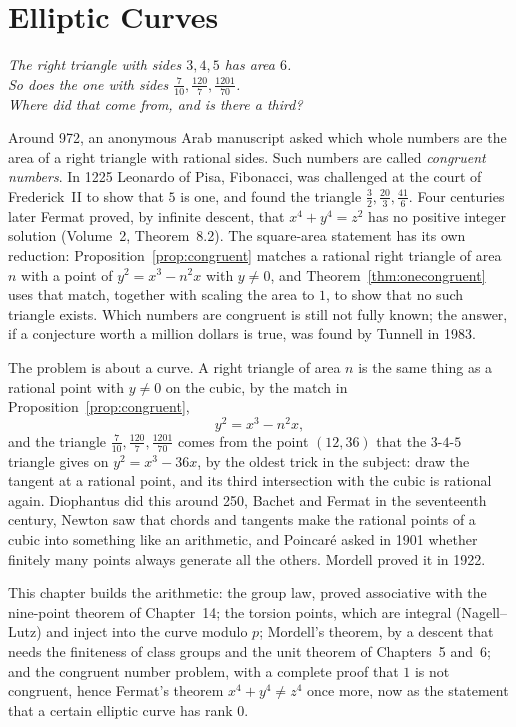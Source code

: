 \chapter{Elliptic Curves}
\begin{center}\itshape
The right triangle with sides $3,4,5$ has area $6$.\\
So does the one with sides $\frac7{10},\frac{120}7,\frac{1201}{70}$.\\
Where did that come from, and is there a third?
\end{center}

Around 972, an anonymous Arab manuscript asked which whole numbers are the area of a right triangle with rational sides. Such numbers
are called \emph{congruent numbers}. In 1225 Leonardo of Pisa, Fibonacci, was challenged at the court of Frederick~II to show that $5$ is
one, and found the triangle $\frac32,\frac{20}3,\frac{41}6$. Four centuries later Fermat proved, by infinite descent, that $x^4+y^4=z^2$ has no positive integer solution (Volume~2, Theorem~8.2). The square-area statement has its own reduction: Proposition~\ref{prop:congruent} matches a rational right triangle of area $n$ with a point of $y^2=x^3-n^2x$ with $y\ne0$, and Theorem~\ref{thm:onecongruent} uses that match, together with scaling the area to $1$, to show that no such triangle exists. Which numbers are congruent is still not fully
known; the answer, if a conjecture worth a million dollars is true, was found by Tunnell in 1983.

The problem is about a curve. A right triangle of area $n$ is the same thing as a rational point with $y\neq0$ on the cubic, by the match in Proposition~\ref{prop:congruent},
\[
y^2=x^3-n^2x,
\]
and the triangle $\frac7{10},\frac{120}7,\frac{1201}{70}$ comes from the point $(12,36)$ that the $3$-$4$-$5$ triangle gives on $y^2=x^3-36x$, by
the oldest trick in the subject: draw the tangent at a rational point, and its third intersection with the cubic is rational again. Diophantus did this
around 250, Bachet and Fermat in the seventeenth century, Newton saw that chords and tangents make the rational points of a cubic into
something like an arithmetic, and Poincar\'e asked in 1901 whether finitely many points always generate all the others. Mordell proved it in 1922.

This chapter builds the arithmetic: the group law, proved associative with the nine-point theorem of Chapter~14; the torsion points, which are
integral (Nagell--Lutz) and inject into the curve modulo $p$; Mordell's theorem, by a descent that needs the finiteness of class groups and the unit
theorem of Chapters~5 and~6; and the congruent number problem, with a complete proof that $1$ is not congruent, hence Fermat's theorem
$x^4+y^4\ne z^4$ once more, now as the statement that a certain elliptic curve has rank $0$.

